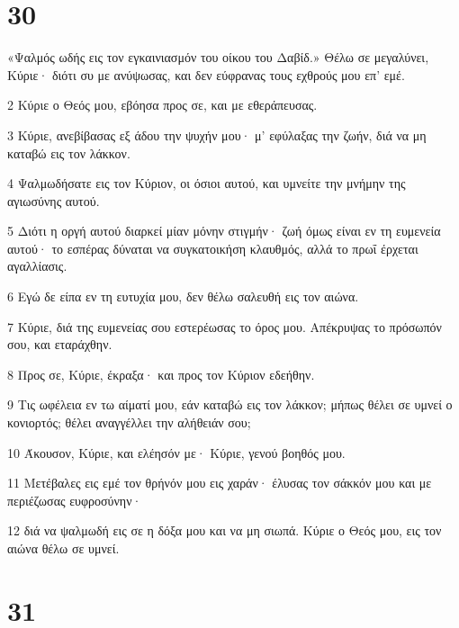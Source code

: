 \chapter{30}

\par «Ψαλμός ωδής εις τον εγκαινιασμόν του οίκου του Δαβίδ.» Θέλω σε μεγαλύνει, Κύριε· διότι συ με ανύψωσας, και δεν εύφρανας τους εχθρούς μου επ' εμέ.
\par 2 Κύριε ο Θεός μου, εβόησα προς σε, και με εθεράπευσας.
\par 3 Κύριε, ανεβίβασας εξ άδου την ψυχήν μου· μ' εφύλαξας την ζωήν, διά να μη καταβώ εις τον λάκκον.
\par 4 Ψαλμωδήσατε εις τον Κύριον, οι όσιοι αυτού, και υμνείτε την μνήμην της αγιωσύνης αυτού.
\par 5 Διότι η οργή αυτού διαρκεί μίαν μόνην στιγμήν· ζωή όμως είναι εν τη ευμενεία αυτού· το εσπέρας δύναται να συγκατοικήση κλαυθμός, αλλά το πρωΐ έρχεται αγαλλίασις.
\par 6 Εγώ δε είπα εν τη ευτυχία μου, δεν θέλω σαλευθή εις τον αιώνα.
\par 7 Κύριε, διά της ευμενείας σου εστερέωσας το όρος μου. Απέκρυψας το πρόσωπόν σου, και εταράχθην.
\par 8 Προς σε, Κύριε, έκραξα· και προς τον Κύριον εδεήθην.
\par 9 Τις ωφέλεια εν τω αίματί μου, εάν καταβώ εις τον λάκκον; μήπως θέλει σε υμνεί ο κονιορτός; θέλει αναγγέλλει την αλήθειάν σου;
\par 10 Άκουσον, Κύριε, και ελέησόν με· Κύριε, γενού βοηθός μου.
\par 11 Μετέβαλες εις εμέ τον θρήνόν μου εις χαράν· έλυσας τον σάκκόν μου και με περιέζωσας ευφροσύνην·
\par 12 διά να ψαλμωδή εις σε η δόξα μου και να μη σιωπά. Κύριε ο Θεός μου, εις τον αιώνα θέλω σε υμνεί.

\chapter{31}

